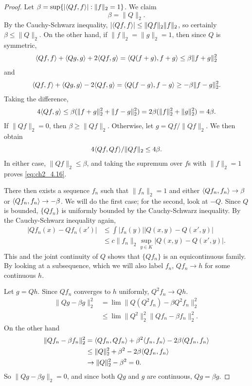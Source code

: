 \begin{proof}
Let $\beta = \sup\{|\langle Qf,f \rangle| : \|f\|_2 = 1\}$. We claim
\begin{equation}\label{eq:ch2_4.16}
    \beta = \|Q\|_2.
\end{equation}
By the Cauchy-Schwarz inequality, $|\langle Qf,f \rangle| \leq \|Qf\|_2\|f\|_2$, so certainly $\beta \leq \|Q\|_2$. On the other hand, if $\|f\|_2 = \|g\|_2 = 1$, then since $Q$ is symmetric,
\[
    \langle Qf,f \rangle + \langle Qg,g \rangle + 2\langle Qf,g \rangle = \langle Q(f+g),f+g \rangle \leq \beta\|f+g\|_2^2
\]
and
\[
    \langle Qf,f \rangle + \langle Qg,g \rangle - 2\langle Qf,g \rangle = \langle Q(f-g),f-g \rangle \geq -\beta\|f-g\|_2^2.
\]
Taking the difference,
\[
    4\langle Qf,g \rangle \leq \beta(\|f+g\|_2^2 + \|f-g\|_2^2) = 2\beta(\|f\|_2^2 + \|g\|_2^2) = 4\beta.
\]
\mnewpage
If $\|Qf\|_2 = 0$, then $\beta \geq \|Qf\|_2$. Otherwise, let $g = Qf/\|Qf\|_2$. We then obtain
\[
    4\langle Qf,Qf \rangle/\|Qf\|_2 \leq 4\beta.
\]
In either case, $\|Qf\|_2 \leq \beta$, and taking the supremum over $f$s with $\|f\|_2 = 1$ proves \eqref{eq:ch2_4.16}.

There then exists a sequence $f_n$ such that $\|f_n\|_2 = 1$ and either $\langle Qf_n,f_n \rangle \to \beta$ or $\langle Qf_n,f_n \rangle \to -\beta$. We will do the first case; for the second, look at $-Q$. Since $Q$ is bounded, $\{Qf_n\}$ is uniformly bounded by the Cauchy-Schwarz inequality. By the Cauchy-Schwarz inequality again,
\begin{align*}
    |Qf_n(x) - Qf_n(x')| &\leq \int |f_n(y)||Q(x,y) - Q(x',y)| \\
    &\leq c\|f_n\|_2 \sup_{y\in K} |Q(x,y) - Q(x',y)|.
\end{align*}
This and the joint continuity of $Q$ shows that $\{Qf_n\}$ is an equicontinuous family. By looking at a subsequence, which we will also label $f_n$, $Qf_n \to h$ for some continuous $h$.

Let $g = Qh$. Since $Qf_n$ converges to $h$ uniformly, $Q^2f_n \to Qh$.
\begin{align*}
    \|Qg - \beta g\|_2^2 &= \lim \|Q(Q^2f_n) - \beta Q^2f_n\|_2^2 \\
    &\leq \lim \|Q^2\|_2^2\|Qf_n - \beta f_n\|_2^2.
\end{align*}
On the other hand
\begin{align*}
    \|Qf_n - \beta f_n\|_2^2 &= \langle Qf_n,Qf_n \rangle + \beta^2\langle f_n,f_n \rangle - 2\beta\langle Qf_n,f_n \rangle \\
    &\leq \|Q\|_2^2 + \beta^2 - 2\beta\langle Qf_n,f_n \rangle \\
    &\to \|Q\|_2^2 - \beta^2 = 0.
\end{align*}
So $\|Qg - \beta g\|_2 = 0$, and since both $Qg$ and $g$ are continuous, $Qg = \beta g$.
\end{proof}

